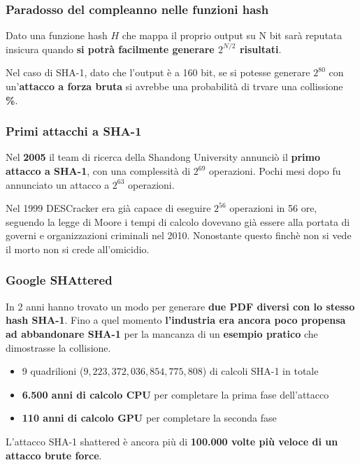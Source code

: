 \begin{frame}
	\frametitle{Paradosso del compleanno nelle funzioni hash}

	Dato una funzione hash \(H\) che mappa il proprio output su N bit sarà reputata insicura quando \textbf{si potrà facilmente generare $2^{N/2}$ risultati}.

	\vspace{1cm}

	Nel caso di SHA-1, dato che l'output è a 160 bit, se si potesse generare $2^{80}$ con un'\textbf{attacco a forza bruta} si avrebbe una probabilità di trvare una collissione \textbf{\%}.
\end{frame}


\begin{frame}
	\frametitle{Primi attacchi a SHA-1}
	Nel \textbf{2005} il team di ricerca della Shandong University annunciò il \textbf{primo attacco a SHA-1}, con una complessità di \(2^{69}\) operazioni.
	Pochi mesi dopo fu annunciato un attacco a \(2^{63}\) operazioni.

	\vspace{1cm}

	Nel 1999 DESCracker era già capace di eseguire \(2^{56}\) operazioni in 56 ore, seguendo la legge di Moore i tempi di calcolo dovevano già essere alla portata di governi e organizzazioni criminali nel 2010.
	Nonostante questo finchè non si vede il morto non si crede all'omicidio.
\end{frame}


\begin{frame}
	\frametitle{Google SHAttered}

	In 2 anni hanno trovato un modo per generare \textbf{due PDF diversi con lo stesso hash SHA-1}.
	Fino a quel momento \textbf{l'industria era ancora poco propensa ad abbandonare SHA-1} per la mancanza di un \textbf{esempio pratico} che dimostrasse la collisione.
	\begin{itemize}
		\item 9 quadrilioni (\(9,223,372,036,854,775,808\)) di calcoli SHA-1 in totale
		\item \textbf{6.500 anni di calcolo CPU} per completare la prima fase dell'attacco
		\item \textbf{110 anni di calcolo GPU} per completare la seconda fase
	\end{itemize}

	L'attacco SHA-1 shattered è ancora più di \textbf{100.000 volte più veloce di un attacco brute force}.
\end{frame}

